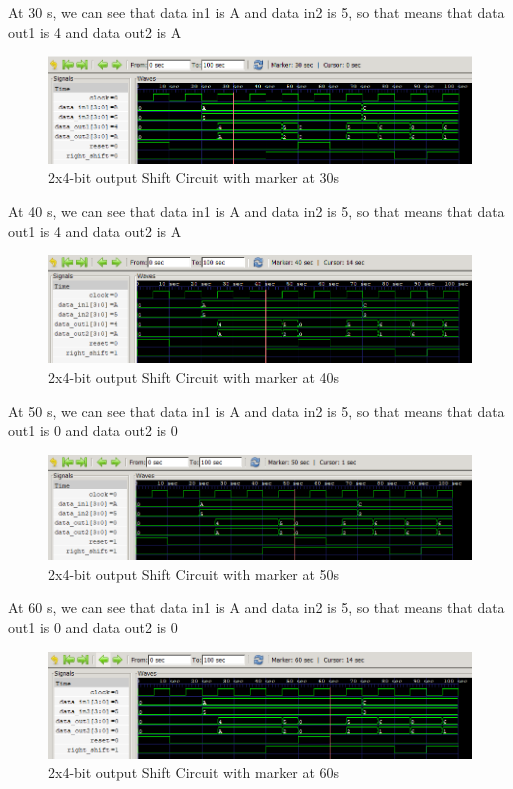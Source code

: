 \documentclass[12pt]{article}
\begin{document}
At 30 s, we can see that data in1 is A and data in2 is 5, so that means that data out1 is 4 and data out2 is A
\begin{figure}[h]
    \centering
    \includegraphics[width = 1.0\textwidth]{figs/Shift30.png}
    \caption{2x4-bit output Shift Circuit with marker at 30s}
    \label{fig:enter-label}
\end{figure}


At 40 s, we can see that data in1 is A and data in2 is 5, so that means that data out1 is 4 and data out2 is A
\begin{figure}[h]
    \centering
    \includegraphics[width = 1.0\textwidth]{figs/Shift40.png}
    \caption{2x4-bit output Shift Circuit with marker at 40s}
    \label{fig:enter-label}
\end{figure}

\newpage

At 50 s, we can see that data in1 is A and data in2 is 5, so that means that data out1 is 0 and data out2 is 0
\begin{figure}[h]
    \centering
    \includegraphics[width = 1.0\textwidth]{figs/Shift50.png}
    \caption{2x4-bit output Shift Circuit with marker at 50s}
    \label{fig:enter-label}
\end{figure}


At 60 s, we can see that data in1 is A and data in2 is 5, so that means that data out1 is 0 and data out2 is 0
\begin{figure}[h]
    \centering
    \includegraphics[width = 1.0\textwidth]{figs/Shift60.png}
    \caption{2x4-bit output Shift Circuit with marker at 60s}
    \label{fig:enter-label}
\end{figure}
\end{document}
